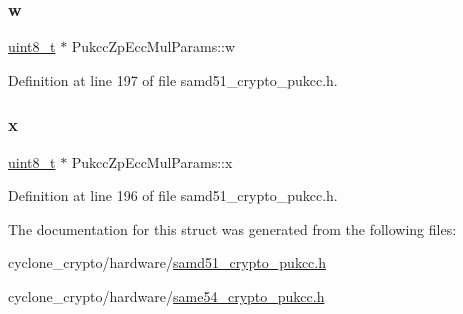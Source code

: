 \subsubsection{\texorpdfstring{w}{w}}
{\footnotesize\ttfamily \hyperlink{stdint_8h_aba7bc1797add20fe3efdf37ced1182c5}{uint8\+\_\+t} $\ast$ Pukcc\+Zp\+Ecc\+Mul\+Params\+::w}



Definition at line 197 of file samd51\+\_\+crypto\+\_\+pukcc.\+h.

\mbox{\label{structPukccZpEccMulParams_ae3b79d9b1db130b111a66cf70c44025d}} 
\subsubsection{\texorpdfstring{x}{x}}
{\footnotesize\ttfamily \hyperlink{stdint_8h_aba7bc1797add20fe3efdf37ced1182c5}{uint8\+\_\+t} $\ast$ Pukcc\+Zp\+Ecc\+Mul\+Params\+::x}



Definition at line 196 of file samd51\+\_\+crypto\+\_\+pukcc.\+h.



The documentation for this struct was generated from the following files\+:\begin{DoxyCompactItemize}
\item 
cyclone\+\_\+crypto/hardware/\hyperlink{samd51__crypto__pukcc_8h}{samd51\+\_\+crypto\+\_\+pukcc.\+h}\item 
cyclone\+\_\+crypto/hardware/\hyperlink{same54__crypto__pukcc_8h}{same54\+\_\+crypto\+\_\+pukcc.\+h}\end{DoxyCompactItemize}
